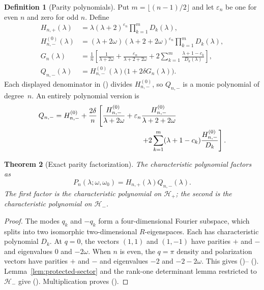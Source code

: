 \documentclass[twoside,10pt]{article}
\numberwithin{equation}{section}
\theoremstyle{slbody}
\newtheorem{theorem}{Theorem}[section]
\theoremstyle{definition}
\newtheorem{definition}[theorem]{Definition}
\theoremstyle{remark}
\renewcommand{\eqref}[1]{%
  \textup{{\normalfont(\oldstylenums{\ref{#1}}}\normalfont)}}
\begin{document}
\begin{definition}[Parity polynomials]\label{def:parity-polynomials}
Put $m=\lfloor(n-1)/2\rfloor$ and let $\varepsilon_n$ be one for even
$n$ and zero for odd $n$.  Define
\begin{align}
 H_{n,+}(\lambda)
   &=\lambda(\lambda+2)^{\varepsilon_n}
     \prod_{k=1}^{m}D_k(\lambda),\label{eq:Hplus}\\
 H_{n,-}^{(0)}(\lambda)
   &=(\lambda+2\omega)
     (\lambda+2+2\omega)^{\varepsilon_n}
     \prod_{k=1}^{m}D_k(\lambda),\label{eq:Hminus0}\\
 G_n(\lambda)
   &=\frac1n\left[
       \frac1{\lambda+2\omega}
       +\frac{\varepsilon_n}{\lambda+2+2\omega}
       +2\sum_{k=1}^{m}\frac{\lambda+1-c_k}{D_k(\lambda)}
     \right],\label{eq:Gfinite}\\
 Q_{n,-}(\lambda)
   &=H_{n,-}^{(0)}(\lambda)\bigl(1+2\delta G_n(\lambda)\bigr).
   \label{eq:Qminus}
\end{align}
Each displayed denominator in \eqref{eq:Qminus} divides
$H_{n,-}^{(0)}$, so $Q_{n,-}$ is a monic polynomial of degree~$n$.
An entirely polynomial version is
\begin{align}
Q_{n,-}={}&H_{n,-}^{(0)}+\frac{2\delta}{n}\left[
 \frac{H_{n,-}^{(0)}}{\lambda+2\omega}
 +\varepsilon_n\frac{H_{n,-}^{(0)}}{\lambda+2+2\omega}\right.\notag\\
&\left.\hspace{38mm}
 +2\sum_{k=1}^{m}(\lambda+1-c_k)
       \frac{H_{n,-}^{(0)}}{D_k}\right].\label{eq:Qminus-poly}
\end{align}
\end{definition}

\begin{theorem}[Exact parity factorization]\label{thm:parity-factor}
The characteristic polynomial factors as
\begin{equation}
 P_n(\lambda;\omega,\omega_0)
   =H_{n,+}(\lambda)Q_{n,-}(\lambda).
 \label{eq:parity-factor}
\end{equation}
The first factor is the characteristic polynomial on $\mathcal H_+$;
the second is the characteristic polynomial on $\mathcal H_-$.
\end{theorem}

\begin{proof}
The modes $q_k$ and $-q_k$ form a four-dimensional Fourier subspace,
which splits into two isomorphic two-dimensional $R$-eigenspaces.  Each
has characteristic polynomial $D_k$.  At $q=0$, the vectors $(1,1)$ and
$(1,-1)$ have parities $+$ and $-$ and eigenvalues $0$ and $-2\omega$.
When $n$ is even, the $q=\pi$ density and polarization vectors have
parities $+$ and $-$ and eigenvalues $-2$ and $-2-2\omega$.  This gives
\eqref{eq:Hplus}--\eqref{eq:Hminus0}.
Lemma~\ref{lem:protected-sector} and the rank-one determinant lemma restricted
to $\mathcal H_-$ give \eqref{eq:Qminus}.  Multiplication proves
\eqref{eq:parity-factor}.
\end{proof}
\end{document}

